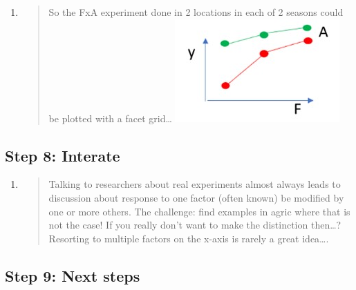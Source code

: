 \documentclass[
]{book}
\begin{document}
\begin{enumerate}
\def\labelenumi{\alph{enumi}.}
\item
  \begin{quote}
  So the FxA experiment done in 2 locations in each of 2 seasons could be plotted with a facet grid\ldots{}
  \includegraphics{img/Picture8.jpg}
  \end{quote}
\end{enumerate}

\hypertarget{step-8-interate}{%
\subsection{Step 8: Interate}\label{step-8-interate}}

\begin{enumerate}
\def\labelenumi{\alph{enumi}.}
\item
  \begin{quote}
  Talking to researchers about real experiments almost always leads to discussion about response to one factor (often known) be modified by one or more others. The challenge: find examples in agric where that is not the case! If you really don't want to make the distinction then\ldots? Resorting to multiple factors on the x-axis is rarely a great idea\ldots.
  \end{quote}
\end{enumerate}

\hypertarget{step-9-next-steps}{%
\subsection{Step 9: Next steps}\label{step-9-next-steps}}
\end{document}
